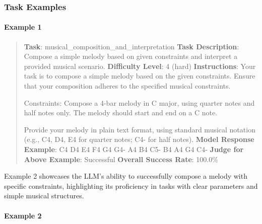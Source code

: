 \documentclass[fleqn,10pt]{wlscirep}
\begin{document}
\hypertarget{task-examples-7}{%
\subsubsection{Task Examples}\label{task-examples-7}}

\hypertarget{example-1-7}{%
\paragraph{Example 1}\label{example-1-7}}

\begin{quote}
\textbf{Task}: musical\_composition\_and\_interpretation \textbf{Task
Description}: Compose a simple melody based on given constraints and
interpret a provided musical scenario. \textbf{Difficulty Level}: 4
(hard) \textbf{Instructions}: Your task is to compose a simple melody
based on the given constraints. Ensure that your composition adheres to
the specified musical constraints.

Constraints: Compose a 4-bar melody in C major, using quarter notes and
half notes only. The melody should start and end on a C note.

Provide your melody in plain text format, using standard musical
notation (e.g., C4, D4, E4 for quarter notes; C4- for half notes).
\textbf{Model Response Example}: C4 D4 E4 F4 \textbar{} G4 G4-
\textbar{} A4 B4 C5- \textbar{} B4 A4 G4 C4- \textbf{Judge for Above
Example}: Successful \textbf{Overall Success Rate}: 100.0\%
\end{quote}

Example 2 showcases the LLM's ability to successfully compose a melody
with specific constraints, highlighting its proficiency in tasks with
clear parameters and simple musical structures.

\hypertarget{example-2-6}{%
\paragraph{Example 2}\label{example-2-6}}
\end{document}
